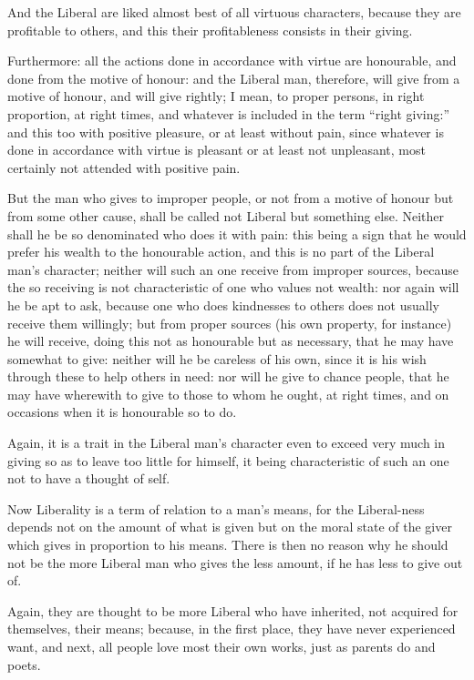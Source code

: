 And the Liberal are liked almost best of all virtuous characters, because they
are profitable to others, and this their profitableness consists in their
giving.

Furthermore: all the actions done in accordance with virtue are honourable, and
done from the motive of honour: and the Liberal man, therefore, will give from
a motive of honour, and will give rightly; I mean, to proper persons, in right
proportion, at right times, and whatever is included in the term “right
giving:” and this too with positive pleasure, or at least without pain,
since whatever is done in accordance with virtue is pleasant or at least not
unpleasant, most certainly not attended with positive pain.

But the man who gives to improper people, or not from a motive of honour but
from some other cause, shall be called not Liberal but something else. Neither
shall he be so denominated who does it with pain: this being a sign that he
would prefer his wealth to the honourable action, and this is no part of the
Liberal man’s character; neither will such an one receive from improper
sources, because the so receiving is not characteristic of one who values not
wealth: nor again will he be apt to ask, because one who does kindnesses to
others does not usually receive them willingly; but from proper sources (his
own property, for instance) he will receive, doing this not as honourable but
as necessary, that he may have somewhat to give: neither will he be careless of
his own, since it is his wish through these to help others in need: nor will he
give to chance people, that he may have wherewith to give to those to whom he
ought, at right times, and on occasions when it is honourable so to do.

Again, it is a trait in the Liberal man’s character even to exceed very
much in giving so as to leave too little for himself, it being characteristic
of such an one not to have a thought of self.

Now Liberality is a term of relation to a man’s means, for the
Liberal-ness depends not on the amount of what is given but on the moral state
of the giver which gives in proportion to his means. There is then no reason
why he should not be the more Liberal man who gives the less amount, if he has
less to give out of.

Again, they are thought to be more Liberal who have inherited, not acquired for
themselves, their means; because, in the first place, they have never
experienced want, and next, all people love most their own works, just as
parents do and poets.

